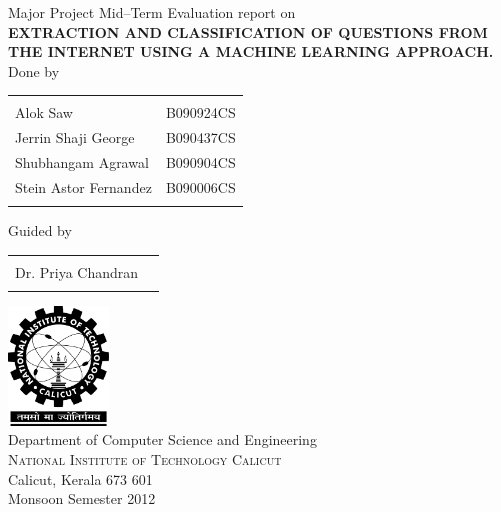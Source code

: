 \begin{titlepage}

\begin{center}

\textup{\large Major Project Mid--Term Evaluation report on}\\[1.0cm]

\uppercase{\Large \textbf {Extraction and classification of questions from the Internet using a Machine Learning approach.}}\\[3.0cm]

\normalsize Done by \\
\begin{table}[h]
\centering
\begin{tabular}{lr}\hline \\
Alok Saw & B090924CS \\ 
Jerrin Shaji George & B090437CS \\ 
Shubhangam Agrawal & B090904CS \\ 
Stein Astor Fernandez & B090006CS \\ \\ \hline 

\end{tabular}
\end{table}

\normalsize Guided by \\ 
\begin{table}[h]
\centering
\begin{tabular}{lr}\hline \\
Dr. Priya Chandran \\ \\ \hline

\end{tabular}
\end{table}

\vfill

\includegraphics[width=0.20\textwidth]{./nitc-logo}\\[1cm]
\LARGE{Department of Computer Science and Engineering}\\
\normalsize
\textsc{National Institute of Technology Calicut}\\
Calicut, Kerala 673 601 \\
\vspace{0.5cm}
Monsoon Semester 2012

\end{center}

\end{titlepage}
